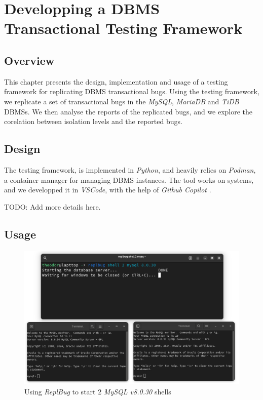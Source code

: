 \chapter{Developping a DBMS Transactional Testing Framework}

\section{Overview}

This chapter presents the design, implementation and usage of a testing framework for replicating DBMS transactional bugs. Using the testing framework, we replicate a set of transactional bugs in the \textit{MySQL}, \textit{MariaDB} and \textit{TiDB} DBMSs. We then analyse the reports of the replicated bugs, and we explore the corelation between isolation levels and the reported bugs.

\section{Design}

The testing framework, is implemented in \textit{Python}, and heavily relies on \textit{Podman}, a container manager \cite{podmanwebpage} for managing DBMS instances. The tool works on  systems, and we developped it in \textit{VSCode}, with the help of \textit{Github Copilot} \cite{copilotwebpage}.

TODO: Add more details  here.



\section{Usage}



\begin{figure}
    \centering
    \includegraphics[width=\linewidth]{assets/replbug_shell.png}
    \caption{Using \textit{ReplBug} to start 2 \textit{MySQL v8.0.30} shells}
    \label{fig:replb_shell}
\end{figure}

